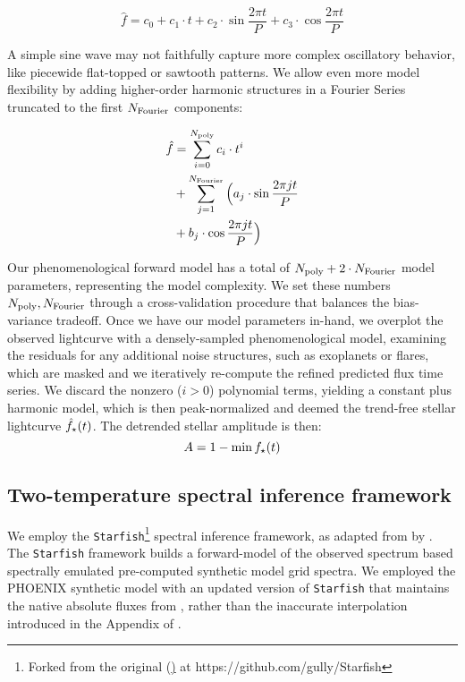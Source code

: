 \documentclass[twocolumn]{emulateapj}%
\begin{document}
\begin{equation}
\hat f = c_0 + c_1 \cdot t + c_2 \cdot \sin{\frac{2\pi t}{P}} + c_3 \cdot \cos{\frac{2\pi t}{P}}
\end{equation}

A simple sine wave may not faithfully capture more complex oscillatory behavior, like piecewide flat-topped or sawtooth patterns.  We allow even more model flexibility by adding higher-order harmonic structures in a Fourier Series \citep{vanderplas15a} truncated to the first $N_{\rm Fourier}$ components:

\begin{equation} \label{eqn:Fourier}
  \begin{split}
 \hat f  & =  \sum_{i=0}^{N_{\rm poly}} c_i \cdot t^i \\
         & + \sum_{j=1}^{N_{\rm Fourier}} \Big( a_j \cdot \sin{\frac{2\pi j t}{P}} \\
         & + b_j \cdot \cos{\frac{2\pi j t}{P}} \Big)
\end{split}
\end{equation}

Our phenomenological forward model has a total of $N_{\rm poly}+2 \cdot N_{\rm Fourier}$ model parameters, representing the model complexity.  We set these numbers $N_{\rm poly}, N_{\rm Fourier}$ through a cross-validation procedure that balances the bias-variance tradeoff.  Once we have our model parameters in-hand, we overplot the observed lightcurve with a densely-sampled phenomenological model, examining the residuals for any additional noise structures, such as exoplanets or flares, which are masked and we iteratively re-compute the refined predicted flux time series.  We discard the nonzero ($i>0$) polynomial terms, yielding a constant plus harmonic model, which is then peak-normalized and deemed the trend-free stellar lightcurve $\hat f_{\rm \star}(t)$.  The detrended stellar amplitude is then: $$ A = 1 - \min{f_{\rm \star}(t)}$$

\subsection{Two-temperature spectral inference framework}

We employ the \texttt{Starfish}\footnote{Forked from the original (\href{https://github.com/iancze/Starfish}) at https://github.com/gully/Starfish} \citep{czekala15} spectral inference framework, as adapted from  by \citet{2017ApJ...836..200G}.  The \texttt{Starfish} framework builds a forward-model of the observed spectrum based spectrally emulated pre-computed synthetic model grid spectra.  We employed the PHOENIX synthetic model with an updated version of \texttt{Starfish} that maintains the native absolute fluxes from \citet{husser13}, rather than the inaccurate interpolation introduced in the Appendix of \citet{2017ApJ...836..200G}.
\end{document}
